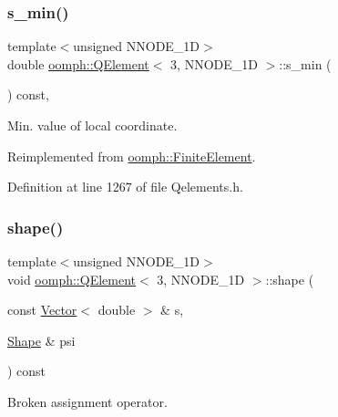 \subsubsection{\texorpdfstring{s\+\_\+min()}{s\_min()}}
{\footnotesize\ttfamily template$<$unsigned N\+N\+O\+D\+E\+\_\+1D$>$ \\
double \hyperlink{classoomph_1_1QElement}{oomph\+::\+Q\+Element}$<$ 3, N\+N\+O\+D\+E\+\_\+1D $>$\+::s\+\_\+min (\begin{DoxyParamCaption}{ }\end{DoxyParamCaption}) const\hspace{0.3cm}{\ttfamily [inline]}, {\ttfamily [virtual]}}



Min. value of local coordinate. 



Reimplemented from \hyperlink{classoomph_1_1FiniteElement_a35f0803115b68bd162c07de04eeb6c5c}{oomph\+::\+Finite\+Element}.



Definition at line 1267 of file Qelements.\+h.

\mbox{\label{classoomph_1_1QElement_3_013_00_01NNODE__1D_01_4_a5cbada7a86a7f28510764921dd9b1978}} 
\subsubsection{\texorpdfstring{shape()}{shape()}}
{\footnotesize\ttfamily template$<$unsigned N\+N\+O\+D\+E\+\_\+1D$>$ \\
void \hyperlink{classoomph_1_1QElement}{oomph\+::\+Q\+Element}$<$ 3, N\+N\+O\+D\+E\+\_\+1D $>$\+::shape (\begin{DoxyParamCaption}\item[{const \hyperlink{classoomph_1_1Vector}{Vector}$<$ double $>$ \&}]{s,  }\item[{\hyperlink{classoomph_1_1Shape}{Shape} \&}]{psi }\end{DoxyParamCaption}) const\hspace{0.3cm}{\ttfamily [virtual]}}



Broken assignment operator. 

